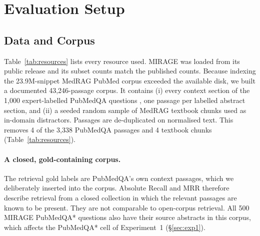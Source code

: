 \documentclass[11pt]{article}
\begin{document}
\section{Evaluation Setup}
\subsection{Data and Corpus}\label{sec:data}
Table~\ref{tab:resources} lists every resource used. MIRAGE was loaded from its public release and its subset counts match the published counts. %
Because indexing the 23.9M-snippet MedRAG PubMed corpus exceeded the available disk, we built a documented 43,246-passage corpus. It contains (i) every context section of the 1,000 expert-labelled PubMedQA questions \citep[\texttt{pqa\_labeled};][]{jin2019pubmedqa}, one passage per labelled abstract section, and (ii) a seeded random sample of MedRAG textbook chunks used as in-domain distractors. %
Passages are de-duplicated on normalised text. This removes 4 of the 3,338 PubMedQA passages and 4 textbook chunks (Table~\ref{tab:resources}). %

\paragraph{A closed, gold-containing corpus.} The retrieval gold labels are PubMedQA's own context passages, which we deliberately inserted into the corpus. Absolute Recall and MRR therefore describe retrieval from a closed collection in which the relevant passages are known to be present. They are not comparable to open-corpus retrieval. All 500 MIRAGE PubMedQA* questions also have their source abstracts in this corpus, which affects the PubMedQA* cell of Experiment~1 (\S\ref{sec:exp1}). %
\end{document}
